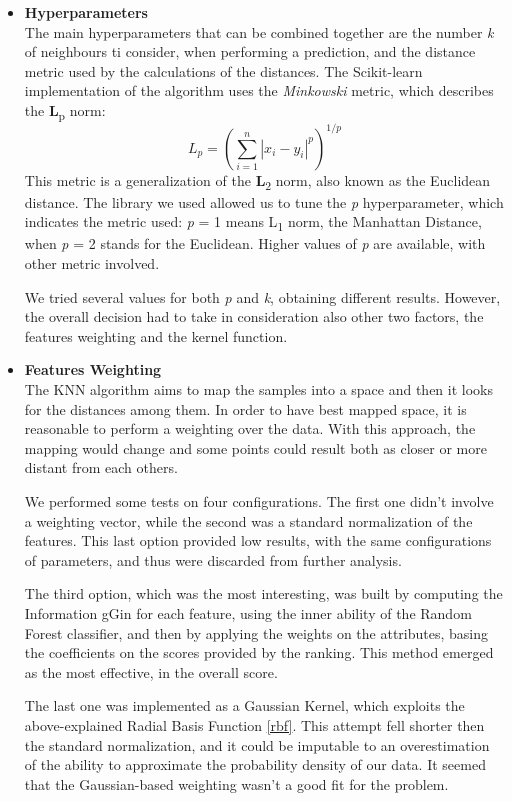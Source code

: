 \begin{itemize}
	\item[\PencilRight]\textbf{Hyperparameters}\\
	The main hyperparameters that can be combined together are the number \textit{k} of neighbours ti consider, when performing a prediction, and the distance metric used by the calculations of the distances.
	The Scikit-learn implementation of the algorithm uses the \textit{Minkowski} metric, which describes the \textbf{L}\textsubscript{p} norm: 
	\[ \mathit{L_{p}} = (\sum\limits_{i = 1}^{n}|x_{i} - y_{i}|^{p})^{1/p} \]
	This metric is a generalization of the \textbf{L}\textsubscript{2} norm, also known as the Euclidean distance.
	The library we used allowed us to tune the \textit{p} hyperparameter, which indicates the metric used: \textit{p} = 1 means L\textsubscript{1} norm, the Manhattan Distance, when \textit{p} = 2 stands for the Euclidean.
	Higher values of \textit{p} are available, with other metric involved.
	
	We tried several values for both \textit{p} and \textit{k}, obtaining different results.
	However, the overall decision had to take in consideration also other two factors, the features weighting and the kernel function.
	
	\item[\PencilRight]\textbf{Features Weighting}\\
	The KNN algorithm aims to map the samples into a space and then it looks for the distances among them. In order to have best mapped space, it is reasonable to perform a weighting over the data. With this approach, the mapping would change and some points could result both as closer or more distant from each others.
	
	We performed some tests on four configurations. The first one didn't involve a weighting vector, while the second was a standard normalization of the features.
	This last option provided low results, with the same configurations of parameters, and thus were discarded from further analysis.

	The third option, which was the most interesting, was built by computing the Information gGin for each feature, using the inner ability of the Random Forest classifier, and then by applying the weights on the attributes, basing the coefficients on the scores provided by the ranking.
	This method emerged as the most effective, in the overall score.
	
	The last one was implemented as a Gaussian Kernel, which exploits the above-explained Radial Basis Function \ref{rbf}.
	This attempt fell shorter then the standard normalization, and it could be imputable to an overestimation of the ability to approximate the probability density of our data.
	It seemed that the Gaussian-based weighting wasn't a good fit for the problem.
\end{itemize}

